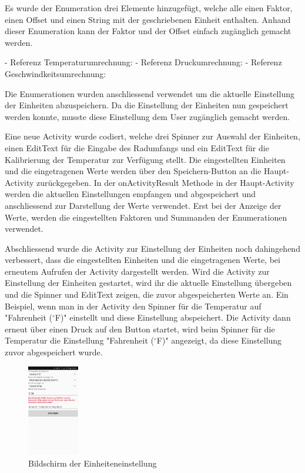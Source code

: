 Es wurde der Enumeration drei Elemente hinzugefügt, welche alle einen Faktor, einen Offset und einen String mit der geschriebenen Einheit enthalten. Anhand dieser Enumeration kann der Faktor und der Offset einfach zugänglich gemacht werden. 

- Referenz Temperaturumrechnung: %
- Referenz Druckumrechnung: %
- Referenz Geschwindkeitsumrechnung: %

Die Enumerationen wurden anschliessend verwendet um die aktuelle Einstellung der Einheiten abzuspeichern. Da die Einstellung der Einheiten nun gespeichert werden konnte, musste diese Einstellung dem User zugänglich gemacht werden.

Eine neue Activity wurde codiert, welche drei Spinner zur Auswahl der Einheiten, einen EditText für die Eingabe des Radumfangs und ein EditText für die Kalibrierung der Temperatur zur Verfügung stellt. Die eingestellten Einheiten und die eingetragenen Werte werden über den Speichern-Button an die Haupt-Activity zurückgegeben. In der onActivityResult Methode in der Haupt-Activity werden die aktuellen Einstellungen empfangen und abgespeichert und anschliessend zur Darstellung der Werte verwendet. Erst bei der Anzeige der Werte, werden die eingestellten Faktoren und Summanden der Enumerationen verwendet.

Abschliessend wurde die Activity zur Einstellung der Einheiten noch dahingehend verbessert, dass die eingestellten Einheiten und die eingetragenen Werte, bei erneutem Aufrufen der Activity dargestellt werden. Wird die Activity zur Einstellung der Einheiten gestartet, wird ihr die aktuelle Einstellung übergeben und die Spinner und EditText zeigen, die zuvor abgespeicherten Werte an. Ein Beispiel, wenn man in der Activity den Spinner für die Temperatur auf "Fahrenheit ($^\circ$F)" einstellt und diese Einstellung abspeichert. Die Activity dann erneut über einen Druck auf den Button startet, wird beim Spinner für die Temperatur die Einstellung "Fahrenheit ($^\circ$F)" angezeigt, da diese Einstellung zuvor abgespeichert wurde.

\begin{figure}[ht]
    \includegraphics[width=0.2\textwidth]{3Vorgehen/imag/BLEEinheitenUndEinstellungenStart.png}
    \caption{Bildschirm der Einheiteneinstellung}
	\label{BLEEinheitenUndEinstellungenStart} 
\end{figure}

